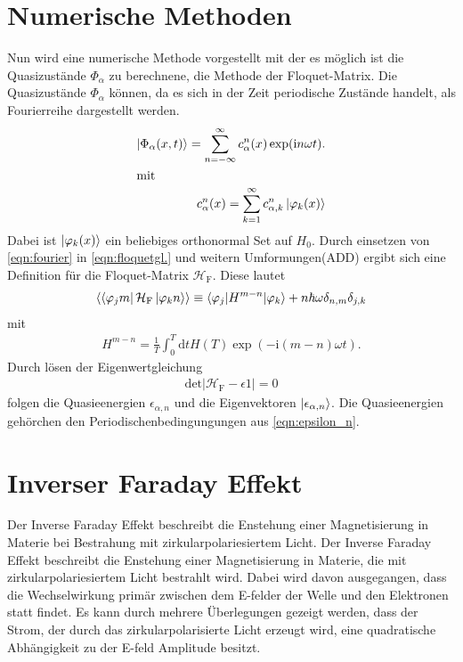 \section{Numerische Methoden}
Nun wird eine numerische Methode vorgestellt mit der es möglich ist
die Quasizustände $\Phi_\alpha$ zu berechnene, die Methode der Floquet-Matrix.
Die Quasizustände $\Phi_\alpha$ können, da es sich in der Zeit periodische Zustände handelt,
als Fourierreihe dargestellt werden.
\begin{align}
  \ket{\Phi_{\alpha}(x,t)}=\sum_{n=-\infty}^{\infty} c_{\alpha}^n (x) \label{eqn:fourier}
  \exp(\mathrm{i}n\omega t).\\
\intertext{mit}
 c_\alpha^n(x)=\sum_{k=1}^\infty c_{\alpha,k}^n \ket{\varphi_k(x)} %
\end{align}
Dabei ist $\ket{\varphi_k(x)}$ ein beliebiges orthonormal Set auf $H_0$.
Durch einsetzen von \eqref{eqn:fourier} in \eqref{eqn:floquetgl.}
und weitern Umformungen(ADD) ergibt sich eine Definition für die Floquet-Matrix $\mathcal{H}_\mathrm{F}$.
Diese lautet
\begin{align}
  \braket{\bra{\varphi_j m}\mathcal{H}_\mathrm{F}\ket{\varphi_k n}}\equiv \braket{\varphi_j|H^{m-n}|\varphi_k} + n\hbar \omega \delta_{n,m}\delta_{j,k}
\end{align}
mit
\begin{align}
H^{m-n}=\frac{1}{T}\int_0^T \mathrm{d}t H(T) \exp\left(-\mathrm{i}(m-n)\omega t\right).
\end{align}
Durch lösen der Eigenwertgleichung
\begin{align}
  \mathrm{det}|\mathcal{H}_\mathrm{F}-\epsilon\mathcal{1}|=0
\end{align}
folgen die Quasieenergien $\epsilon_{\alpha,n}$ und die Eigenvektoren $\ket{\epsilon_{\alpha,n}}$.
Die Quasieenergien gehörchen den Periodischenbedingungungen aus \eqref{eqn:epsilon_n}.


\section{Inverser Faraday Effekt}
Der Inverse Faraday Effekt beschreibt die Enstehung einer Magnetisierung in Materie bei Bestrahung mit zirkularpolariesiertem Licht.
Der Inverse Faraday Effekt beschreibt die Enstehung einer Magnetisierung in Materie, die mit zirkularpolariesiertem Licht bestrahlt wird.
Dabei wird davon ausgegangen, dass die Wechselwirkung primär zwischen dem E-felder der Welle und den Elektronen statt findet.
Es kann durch mehrere Überlegungen gezeigt werden, dass der Strom, der durch das zirkularpolarisierte Licht erzeugt wird, eine quadratische Abhängigkeit
zu der E-feld Amplitude besitzt.
